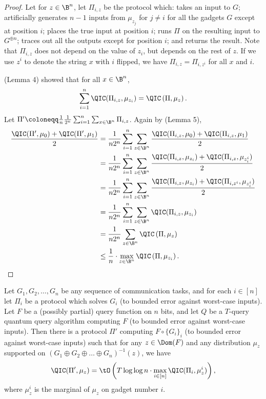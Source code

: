 \begin{proof}
Let for $z\in\B^n$, let $\Pi_{i,z}$ be the protocol which:
takes an input to $G$;
artificially generates $n-1$ inputs from $\mu_{z_j}$ for $j\ne i$
for all the gadgets $G$ except at position $i$; places
the true input at position $i$; runs $\Pi$ on the resulting
input to $G^{\oplus n}$; traces out all the outputs except for
position $i$; and returns the result. Note that $\Pi_{i,z}$
does not depend on the value of $z_i$, but depends on the rest of $z$.
If we use $z^i$ to denote the string $x$ with $i$ flipped, we have
$\Pi_{i,z}=\Pi_{i,z^i}$ for all $x$ and $i$.

\cite{Tou15} (Lemma 4) showed that for all $x\in\B^n$,
\[\sum_{i=1}^n\QIC(\Pi_{i,z},\mu_{z_i})
=\QIC\left(\Pi,\mu_{z}\right).\]
Let $\Pi'\coloneqq\frac{1}{n}\frac{1}{2^n}\sum_{i=1}^n\sum_{x\in\B^n}\Pi_{i,z}$.
Again by \cite{Tou15} (Lemma 5),
\begin{align*}
\frac{\QIC(\Pi',\mu_0)+\QIC(\Pi',\mu_1)}{2}
&=\frac{1}{n2^n}\sum_{i=1}^n\sum_{z\in\B^n}
	\frac{\QIC(\Pi_{i,z},\mu_0)+\QIC(\Pi_{i,z},\mu_1)}{2}\\
&=\frac{1}{n2^n}\sum_{i=1}^n\sum_{z\in\B^n}
	\frac{\QIC(\Pi_{i,z},\mu_{z_i})+\QIC(\Pi_{i,z},\mu_{z^i_i})}{2}\\
&=\frac{1}{n2^n}\sum_{i=1}^n\sum_{z\in\B^n}
	\frac{\QIC(\Pi_{i,z},\mu_{z_i})+\QIC(\Pi_{i,z^i},\mu_{z^i_i})}{2}\\
&=\frac{1}{n2^n}\sum_{i=1}^n\sum_{z\in\B^n}\QIC(\Pi_{i,z},\mu_{z_i})\\
&=\frac{1}{n2^n}\sum_{z\in\B^n}\QIC\left(\Pi,\mu_z\right)\\
&\le \frac{1}{n}\cdot\max_{z\in\B^n}\QIC\left(\Pi,\mu_{z_i}\right).\qedhere
\end{align*}
\end{proof}


\begin{lemma}\label{lem:query_QIC}
Let $G_1,G_2,\dots,G_n$ be any sequence of communication tasks,
and for each $i\in[n]$ let $\Pi_i$ be a protocol which
solves $G_i$ (to bounded error against worst-case inputs).
Let $F$ be a (possibly partial) query function on $n$ bits, and let $Q$
be a $T$-query quantum query algorithm computing $F$ (to bounded error
against worst-case inputs).
Then there is a protocol $\Pi'$ computing $F\circ \{G_i\}_i$ (to bounded
error against worst-case inputs)
such that for any $z\in\Dom(F)$ and any distribution $\mu_z$ supported on
$(G_1\oplus G_2\oplus\dots\oplus G_n)^{-1}(z)$, we have
\[\QIC(\Pi',\mu_z)=\tO\left(T\log\log n\cdot \max_{i\in[n]}\QIC(\Pi_i,\mu^i_z)\right),\]
where $\mu^i_z$ is the marginal of $\mu_z$ on gadget number $i$.
\end{lemma}


